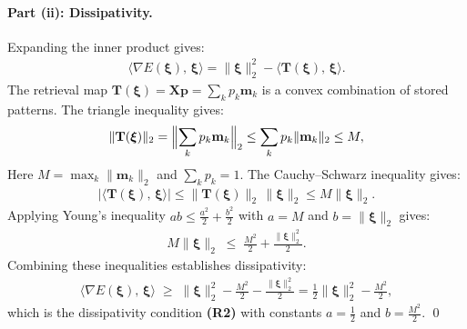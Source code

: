 \paragraph{Part (ii): Dissipativity.}
Expanding the inner product gives:
\begin{align*}
\langle\nabla E(\boldsymbol{\xi}),\,\boldsymbol{\xi}\rangle
= \|\boldsymbol{\xi}\|_{2}^{2} - \langle\mathbf{T}(\boldsymbol{\xi}),\,\boldsymbol{\xi}\rangle.
\end{align*}
The retrieval map $\mathbf{T}(\boldsymbol{\xi})=\mathbf{X}\mathbf{p}=\sum_{k}p_{k}\mathbf{m}_{k}$ is a convex combination of stored patterns. The triangle inequality gives:
\begin{align*}
\|\mathbf{T}(\boldsymbol{\xi})\|_{2}
= \Bigl\|\sum_{k}p_{k}\mathbf{m}_{k}\Bigr\|_{2}
\le \sum_{k}p_{k}\|\mathbf{m}_{k}\|_{2}
\le M,
\end{align*}
Here $M=\max_{k}\|\mathbf{m}_{k}\|_{2}$ and $\sum_{k}p_{k}=1$. The
Cauchy--Schwarz inequality gives:
\begin{align*}
|\langle\mathbf{T}(\boldsymbol{\xi}),\,\boldsymbol{\xi}\rangle|
\le \|\mathbf{T}(\boldsymbol{\xi})\|_{2}\,\|\boldsymbol{\xi}\|_{2}
\le M\|\boldsymbol{\xi}\|_{2}.
\end{align*}
Applying Young's inequality $ab\le\tfrac{a^{2}}{2}+\tfrac{b^{2}}{2}$ with $a=M$ and $b=\|\boldsymbol{\xi}\|_{2}$ gives:
\begin{align*}
M\|\boldsymbol{\xi}\|_{2}
\;\le\; \frac{M^{2}}{2} + \frac{\|\boldsymbol{\xi}\|_{2}^{2}}{2}.
\end{align*}
Combining these inequalities establishes dissipativity:
\begin{align*}
\langle\nabla E(\boldsymbol{\xi}),\,\boldsymbol{\xi}\rangle
\;\ge\; \|\boldsymbol{\xi}\|_{2}^{2} - \frac{M^{2}}{2} - \frac{\|\boldsymbol{\xi}\|_{2}^{2}}{2}
= \frac{1}{2}\|\boldsymbol{\xi}\|_{2}^{2} - \frac{M^{2}}{2},
\end{align*}
which is the dissipativity condition \textbf{(R2)} with constants $a=\tfrac{1}{2}$ and $b=\tfrac{M^{2}}{2}$. \qed


